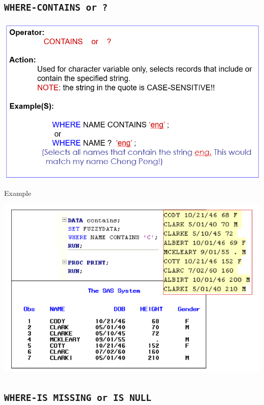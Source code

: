 \documentclass[
]{book}
\begin{document}
\hypertarget{where-contains-or}{%
\subsection{\texorpdfstring{\texttt{WHERE-CONTAINS\ or\ ?}}{WHERE-CONTAINS or ?}}\label{where-contains-or}}

\begin{center}\includegraphics[width=1\linewidth]{img09/w09-WHERE-CONTAINS} \end{center}

Example

\begin{center}\includegraphics[width=1\linewidth]{img09/w09-CONTAINS-EXP} \end{center}

\hypertarget{where-is-missing-or-is-null}{%
\subsection{\texorpdfstring{\texttt{WHERE-IS\ MISSING\ or\ IS\ NULL}}{WHERE-IS MISSING or IS NULL}}\label{where-is-missing-or-is-null}}
\end{document}
